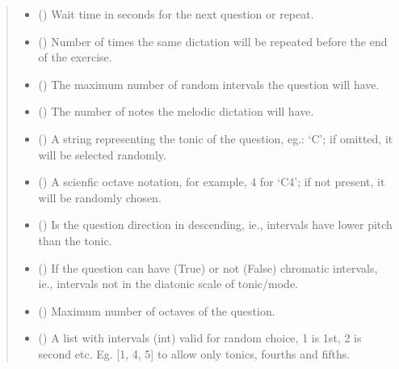\documentclass[letterpaper,10pt,english]{sphinxmanual}
\begin{document}
\begin{fulllineitems}
\begin{fulllineitems}
\begin{quote}
\begin{description}
\begin{itemize}
\item {} 
 () \textendash{} Wait time in seconds for the next question or
repeat.

\item {} 
 () \textendash{} Number of times the same dictation will be
repeated before the end of the exercise.

\item {} 
 () \textendash{} The maximum number of random intervals the
question will have.

\item {} 
 () \textendash{} The number of notes the melodic dictation will have.

\item {} 
 () \textendash{} A string representing the tonic of the question,
eg.: ‘C’; if omitted, it will be selected randomly.

\item {} 
 () \textendash{} A scienfic octave notation, for example, 4 for ‘C4’;
if not present, it will be randomly chosen.

\item {} 
 () \textendash{} Is the question direction in descending, ie.,
intervals have lower pitch than the tonic.

\item {} 
 () \textendash{} If the question can have (True) or not (False)
chromatic intervals, ie., intervals not in the diatonic scale
of tonic/mode.

\item {} 
 () \textendash{} Maximum number of octaves of the question.

\item {} 
 () \textendash{} A list with intervals (int) valid for
random choice, 1 is 1st, 2 is second etc. Eg. {[}1, 4, 5{]} to
allow only tonics, fourths and fifths.


\end{itemize}
\end{description}
\end{quote}
\end{fulllineitems}
\end{fulllineitems}
\end{document}
